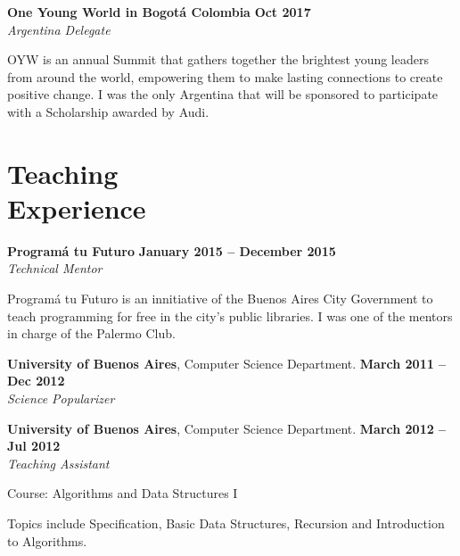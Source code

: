 \documentclass[margin,line]{resume}
\begin{document}
\begin{resume}
\textbf{ One Young World in Bogot\'a Colombia} \hfill 
 \hfill \textbf{Oct 2017} \vspace{2mm}\\\vspace{1mm}
\textsl{Argentina Delegate } 

OYW is an annual Summit that gathers together the brightest young leaders from around the world, empowering them to make lasting connections to create positive change.  I was the only Argentina that will be sponsored to participate with a Scholarship awarded by Audi.
\newpage

\section{\mysidestyle Teaching\\Experience}

\textbf{Program\'a tu Futuro} \hfill \textbf{January 2015 --  December 2015}
\\
\textsl{Technical Mentor} \hfill 
\begin{list2}
	\item Program\'a tu Futuro is an innitiative of the Buenos Aires City Government to teach programming for free in the city's public libraries. I was one of the mentors in charge of the Palermo Club.
\end{list2}\vspace{-1.5mm}

\textbf{University of Buenos Aires}, Computer Science Department. \hfill \textbf{March 2011 --  Dec 2012}
\\
\textsl{Science Popularizer} \hfill 

\textbf{University of Buenos Aires}, Computer Science Department. \hfill \textbf{March 2012 --  Jul 2012}
\\
\textsl{Teaching Assistant} \hfill
\begin{list2}
	\item Course: Algorithms and Data Structures I
	\item Topics include Specification, Basic Data Structures, Recursion and Introduction to Algorithms.
\end{list2}\vspace{-1.5mm}

\vspace{2mm}



\end{resume}
\end{document}
